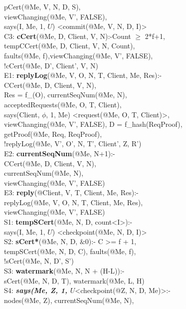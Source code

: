 \begin{code}
\> pCert(@Me, V, N, D, S), \\
\> viewChanging(@Me, V', FALSE), \\
\> says(I, Me, 1, $U$) <commit(@Me, V, N, D, I)>\\
C3: \textbf{cCert}(@Me, D, Client, V, N):-Count $\geq$ 2*f+1,\\
\> tempCCert(@Me, D, Client, V, N, Count), \\
\> faults(@Me, f),viewChanging(@Me, V', FALSE), \\
\> !cCert(@Me, D', Client', V, N)\\
E1: \textbf{replyLog}(@Me, V, O, N, T, Client, Me, Res):-\\
\> CCert(@Me, D, Client, V, N),\\
\> Res = f\_(O), currentSeqNum(@Me, N),\\
\> acceptedRequests(@Me, O, T, Client),\\
\> says(Client, $\phi$, 1, Me) <request(@Me, O, T, Client)>, \\
\> viewChanging(@Me, V', FALSE), D = f\_hash(ReqProof),\\
\> getProof(@Me, Req, ReqProof),\\
\> !replyLog(@Me, V', O', N, T', Client', Z, R')\\
E2: \textbf{currentSeqNum}(@Me, N+1):-\\
\> CCert(@Me, D, Client, V, N),\\
\> currentSeqNum(@Me, N), \\
\> viewChanging(@Me, V', FALSE)\\
E3: \textbf{reply}(@Client, V, T, Client, Me, Res):-\\
\> replyLog(@Me, V, O, N, T, Client, Me, Res),\\
\> viewChanging(@Me, V', FALSE)\\
S1: \textbf{tempSCert}(@Me, N, D, count<I>):- \\
\> says(I, Me, 1, $U$) <checkpoint(@Me, N, D, I)> \\
S2: \textbf{sCert*}(@Me, N, D, $\&0$):- C >= f + 1,\\
\> tempSCert(@Me, N, D, C), faults(@Me, f),\\
\> !sCert(@Me, N, D', S')\\
S3: \textbf{watermark}(@Me, N, N + (H-L)):- \\
\> sCert(@Me, N, D, T), watermark(@Me, L, H)\\
S4: \textbf{\textit{says(Me, Z, 1, $U$}}<checkpoint(@Z, N, D, Me)>:-\\
\> nodes(@Me, Z), currentSeqNum(@Me, N), \\

\end{code}

